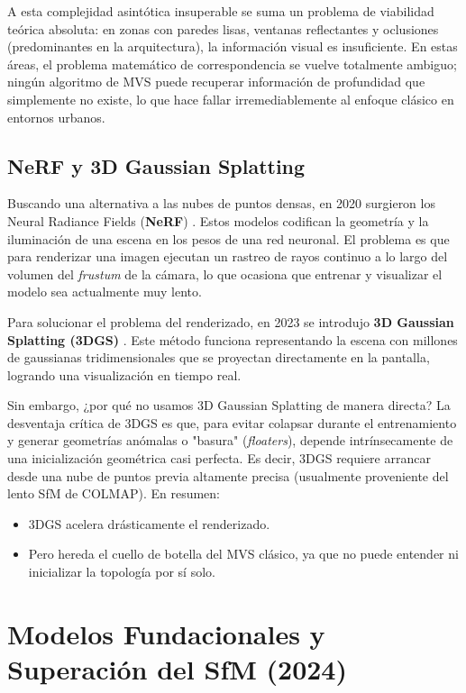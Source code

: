 A esta complejidad asintótica insuperable se suma un problema de viabilidad teórica absoluta: en zonas con paredes lisas, ventanas reflectantes y oclusiones (predominantes en la arquitectura), la información visual es insuficiente. En estas áreas, el problema matemático de correspondencia se vuelve totalmente ambiguo; ningún algoritmo de MVS puede recuperar información de profundidad que simplemente no existe, lo que hace fallar irremediablemente al enfoque clásico en entornos urbanos.

\subsection{NeRF y 3D Gaussian Splatting}

Buscando una alternativa a las nubes de puntos densas, en 2020 surgieron los Neural Radiance Fields (\textbf{NeRF}) \cite{mildenhall2020nerf}. Estos modelos codifican la geometría y la iluminación de una escena en los pesos de una red neuronal. El problema es que para renderizar una imagen ejecutan un rastreo de rayos continuo a lo largo del volumen del \textit{frustum} de la cámara, lo que ocasiona que entrenar y visualizar el modelo sea actualmente muy lento.

Para solucionar el problema del renderizado, en 2023 se introdujo \textbf{3D Gaussian Splatting (3DGS)} \cite{kerbl20233d}. Este método funciona representando la escena con millones de gaussianas tridimensionales que se proyectan directamente en la pantalla, logrando una visualización en tiempo real. 

Sin embargo, ¿por qué no usamos 3D Gaussian Splatting de manera directa? La desventaja crítica de 3DGS es que, para evitar colapsar durante el entrenamiento y generar geometrías anómalas o "basura" (\textit{floaters}), depende intrínsecamente de una inicialización geométrica casi perfecta. Es decir, 3DGS requiere arrancar desde una nube de puntos previa altamente precisa (usualmente proveniente del lento SfM de COLMAP). En resumen:
\begin{itemize}
    \item 3DGS acelera drásticamente el renderizado.
    \item Pero hereda el cuello de botella del MVS clásico, ya que no puede entender ni inicializar la topología por sí solo.
\end{itemize}

\section{Modelos Fundacionales y Superación del SfM (2024)}

